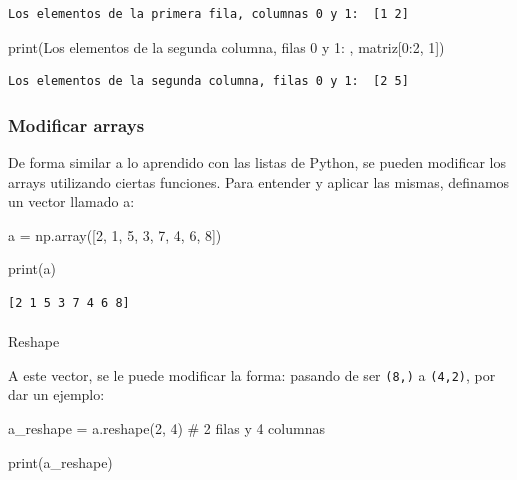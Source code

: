 \documentclass[
  letterpaper,
  DIV=11,
  numbers=noendperiod]{scrreprt}
\makeatletter
\let\oldparagraph\paragraph
\renewcommand{\paragraph}{
    \@ifstar
      \xxxParagraphStar
      \xxxParagraphNoStar
  }
\newcommand{\xxxParagraphStar}[1]{\oldparagraph*{#1}\mbox{}}
\newcommand{\xxxParagraphNoStar}[1]{\oldparagraph{#1}\mbox{}}
\newenvironment{Shaded}{\begin{snugshade}}{\end{snugshade}}
\newcommand{\BuiltInTok}[1]{\textcolor[rgb]{0.00,0.23,0.31}{#1}}
\newcommand{\CommentTok}[1]{\textcolor[rgb]{0.37,0.37,0.37}{#1}}
\newcommand{\DecValTok}[1]{\textcolor[rgb]{0.68,0.00,0.00}{#1}}
\newcommand{\NormalTok}[1]{\textcolor[rgb]{0.00,0.23,0.31}{#1}}
\newcommand{\OperatorTok}[1]{\textcolor[rgb]{0.37,0.37,0.37}{#1}}
\newcommand{\StringTok}[1]{\textcolor[rgb]{0.13,0.47,0.30}{#1}}
\makeatother
\begin{document}
\begin{verbatim}
Los elementos de la primera fila, columnas 0 y 1:  [1 2]
\end{verbatim}

\begin{Shaded}
\begin{Highlighting}[]
\BuiltInTok{print}\NormalTok{(}\StringTok{\textquotesingle{}Los elementos de la segunda columna, filas 0 y 1: \textquotesingle{}}\NormalTok{, matriz[}\DecValTok{0}\NormalTok{:}\DecValTok{2}\NormalTok{, }\DecValTok{1}\NormalTok{])}
\end{Highlighting}
\end{Shaded}

\begin{verbatim}
Los elementos de la segunda columna, filas 0 y 1:  [2 5]
\end{verbatim}

\subsubsection{Modificar arrays}\label{modificar-arrays}

De forma similar a lo aprendido con las listas de Python, se pueden
modificar los arrays utilizando ciertas funciones. Para entender y
aplicar las mismas, definamos un vector llamado a:

\begin{Shaded}
\begin{Highlighting}[]
\NormalTok{a }\OperatorTok{=}\NormalTok{ np.array([}\DecValTok{2}\NormalTok{, }\DecValTok{1}\NormalTok{, }\DecValTok{5}\NormalTok{, }\DecValTok{3}\NormalTok{, }\DecValTok{7}\NormalTok{, }\DecValTok{4}\NormalTok{, }\DecValTok{6}\NormalTok{, }\DecValTok{8}\NormalTok{])}

\BuiltInTok{print}\NormalTok{(a)}
\end{Highlighting}
\end{Shaded}

\begin{verbatim}
[2 1 5 3 7 4 6 8]
\end{verbatim}

\paragraph{Reshape}\label{reshape}

A este vector, se le puede modificar la forma: pasando de ser
\texttt{(8,)} a \texttt{(4,2)}, por dar un ejemplo:

\begin{Shaded}
\begin{Highlighting}[]
\NormalTok{a\_reshape }\OperatorTok{=}\NormalTok{ a.reshape(}\DecValTok{2}\NormalTok{, }\DecValTok{4}\NormalTok{) }\CommentTok{\# 2 filas y 4 columnas}

\BuiltInTok{print}\NormalTok{(a\_reshape)}
\end{Highlighting}
\end{Shaded}
\end{document}

